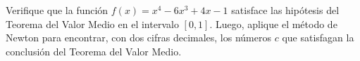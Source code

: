 \item Verifique que la función $f(x) = x^4 - 6x^3 + 4x - 1$ satisface las hipótesis del Teorema del Valor Medio en el intervalo $[0, 1]$. Luego, aplique el método de Newton para encontrar, con dos cifras decimales, los números $c$ que satisfagan la conclusión del Teorema del Valor Medio.
